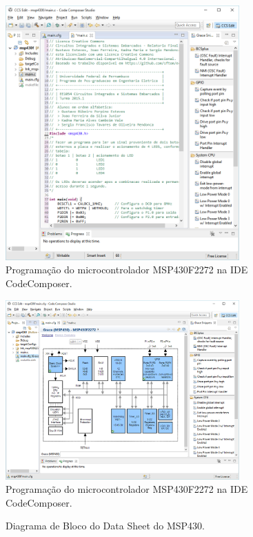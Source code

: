\documentclass[
	12pt,				%
	openright,			%
  oneside,     %
	a4paper,			%
	english,			%
	french,				%
	spanish,			%
	brazil				%
	]{abntex2}
\begin{document}
\begin{figure}[ht]
  \centering
  \caption{\label{fig:cha-4-CodeComposer00}Programação do microcontrolador MSP430F2272 na IDE CodeComposer.}
  \includegraphics[width=0.8\textwidth]{images/Atividade04/CodeComposer00.png}
\end{figure}

\begin{figure}[ht]
  \centering
  \caption{\label{fig:cha-4-CodeComposer01}Programação do microcontrolador MSP430F2272 na IDE CodeComposer.}
  \includegraphics[width=0.8\textwidth]{images/Atividade04/CodeComposer01.png}
\end{figure}

\newpage
\begin{figure}[H]
  \centering
  \caption{\label{cha:4-diagrama-bloco-microcontrolador}Diagrama de Bloco do Data Sheet do MSP430.}
  
\end{figure}
\end{document}
